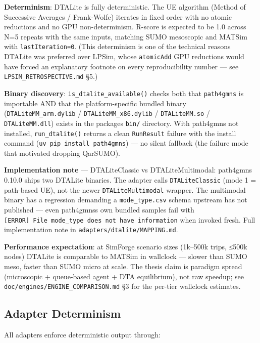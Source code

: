 \textbf{Determinism}: DTALite is fully deterministic. The UE algorithm
(Method of Successive Averages / Frank-Wolfe) iterates in fixed order
with no atomic reductions and no GPU non-determinism. R-score is
expected to be 1.0 across N=5 repeats with the same inputs, matching
SUMO mesoscopic and MATSim with \texttt{lastIteration=0}. (This
determinism is one of the technical reasons DTALite was preferred over
LPSim, whose \texttt{atomicAdd} GPU reductions would have forced an
explanatory footnote on every reproducibility number --- see
\texttt{LPSIM\_RETROSPECTIVE.md} §5.)

\textbf{Binary discovery}: \texttt{is\_dtalite\_available()} checks both
that \texttt{path4gmns} is importable AND that the platform-specific
bundled binary (\texttt{DTALiteMM\_arm.dylib} /
\texttt{DTALiteMM\_x86.dylib} / \texttt{DTALiteMM.so} /
\texttt{DTALiteMM.dll}) exists in the package\textquotesingle s
\texttt{bin/} directory. With path4gmns not installed,
\texttt{run\_dtalite()} returns a clean \texttt{RunResult} failure with
the install command (\texttt{uv\ pip\ install\ path4gmns}) --- no silent
fallback (the failure mode that motivated dropping QarSUMO).

\textbf{Implementation note} --- DTALiteClassic vs DTALiteMultimodal:
path4gmns 0.10.0 ships two DTALite binaries. The adapter calls
\texttt{DTALiteClassic} (mode 1 = path-based UE), not the newer
\texttt{DTALiteMultimodal} wrapper. The multimodal binary has a
regression demanding a \texttt{mode\_type.csv} schema upstream has not
published --- even path4gmns\textquotesingle s own bundled samples fail
with
\texttt{{[}ERROR{]}\ File\ mode\_type\ does\ not\ have\ information}
when invoked fresh. Full implementation note in
\texttt{adapters/dtalite/MAPPING.md}.

\textbf{Performance expectation}: at SimForge scenario sizes (1k--500k
trips, ≤500k nodes) DTALite is comparable to MATSim in wallclock ---
slower than SUMO meso, faster than SUMO micro at scale. The thesis claim
is paradigm spread (microscopic + queue-based agent + DTA equilibrium),
not raw speedup; see \texttt{doc/engines/ENGINE\_COMPARISON.md} §3 for
the per-tier wallclock estimates.

\subsection{Adapter Determinism}\label{345-adapter-determinism}

All adapters enforce deterministic output through:

